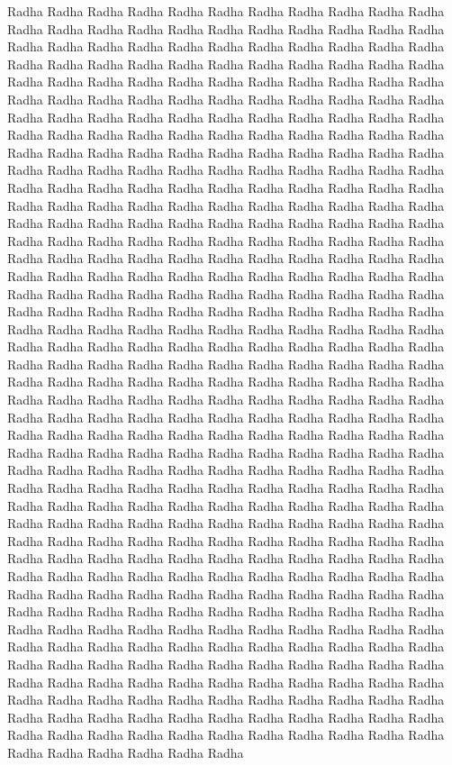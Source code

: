 Radha Radha Radha Radha Radha Radha Radha Radha Radha Radha Radha Radha Radha Radha Radha Radha Radha Radha
Radha Radha Radha Radha Radha Radha Radha Radha Radha Radha Radha Radha Radha Radha Radha Radha Radha Radha
Radha Radha Radha Radha Radha Radha Radha Radha Radha Radha Radha Radha Radha Radha Radha Radha Radha Radha
Radha Radha Radha Radha Radha Radha Radha Radha Radha Radha Radha Radha Radha Radha Radha Radha Radha Radha
Radha Radha Radha Radha Radha Radha Radha Radha Radha Radha Radha Radha Radha Radha Radha Radha Radha Radha
Radha Radha Radha Radha Radha Radha Radha Radha Radha Radha Radha Radha Radha Radha Radha Radha Radha Radha 
Radha Radha Radha Radha Radha Radha Radha Radha Radha Radha Radha Radha Radha Radha Radha Radha Radha Radha 
Radha Radha Radha Radha Radha Radha Radha Radha Radha Radha Radha Radha Radha Radha Radha Radha Radha Radha
Radha Radha Radha Radha Radha Radha Radha Radha Radha Radha Radha Radha Radha Radha Radha Radha Radha Radha
Radha Radha Radha Radha Radha Radha Radha Radha Radha Radha Radha Radha Radha Radha Radha Radha Radha Radha
Radha Radha Radha Radha Radha Radha Radha Radha Radha Radha Radha Radha Radha Radha Radha Radha Radha Radha 
Radha Radha Radha Radha Radha Radha Radha Radha Radha Radha Radha Radha Radha Radha Radha Radha Radha Radha 
Radha Radha Radha Radha Radha Radha Radha Radha Radha Radha Radha Radha Radha Radha Radha Radha Radha Radha 
Radha Radha Radha Radha Radha Radha Radha Radha Radha Radha Radha Radha Radha Radha Radha Radha Radha Radha 
Radha Radha Radha Radha Radha Radha Radha Radha Radha Radha Radha Radha Radha Radha Radha Radha Radha Radha
Radha Radha Radha Radha Radha Radha Radha Radha Radha Radha Radha Radha Radha Radha Radha Radha Radha Radha 
Radha Radha Radha Radha Radha Radha Radha Radha Radha Radha Radha Radha Radha Radha Radha Radha Radha Radha 
Radha Radha Radha Radha Radha Radha Radha Radha Radha Radha Radha Radha Radha Radha Radha Radha Radha Radha 
Radha Radha Radha Radha Radha Radha Radha Radha Radha Radha Radha Radha Radha Radha Radha Radha Radha Radha 
Radha Radha Radha Radha Radha Radha Radha Radha Radha Radha Radha Radha Radha Radha Radha Radha Radha Radha 
Radha Radha Radha Radha Radha Radha Radha Radha Radha Radha Radha Radha Radha Radha Radha Radha Radha Radha
Radha Radha Radha Radha Radha Radha Radha Radha Radha Radha Radha Radha Radha Radha Radha Radha Radha Radha
Radha Radha Radha Radha Radha Radha Radha Radha Radha Radha Radha Radha Radha Radha Radha Radha Radha Radha
Radha Radha Radha Radha Radha Radha Radha Radha Radha Radha Radha Radha Radha Radha Radha Radha Radha Radha
Radha Radha Radha Radha Radha Radha Radha Radha Radha Radha Radha Radha Radha Radha Radha Radha Radha Radha
Radha Radha Radha Radha Radha Radha Radha Radha Radha Radha Radha Radha Radha Radha Radha Radha Radha Radha
